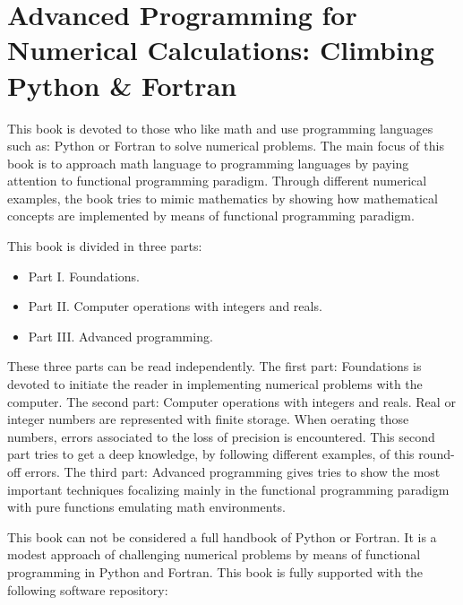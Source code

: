 \chapter*{Advanced Programming for Numerical Calculations: Climbing Python \& Fortran}
\vspace{-2.5cm}
This book is devoted to those who like math and  use  
programming languages such as: Python or Fortran to solve numerical problems.  
The main focus of this book is to approach math language to programming languages by 
paying attention to functional programming paradigm.
Through different numerical examples, 
the book tries to mimic mathematics by showing how  mathematical concepts 
are implemented by means of functional programming paradigm. 
 

This book is divided in three parts: 
\begin{itemize}
\setlength\itemsep{0cm}
\item[] Part I. Foundations. 
\item[] Part II. Computer operations with integers and reals. 
\item[] Part III. Advanced programming. 
\end{itemize}
\vspace{-0.2cm}
These three parts can be read  independently. The first part: Foundations is devoted to 
initiate the reader in implementing  numerical problems with the computer.
The second part: Computer operations with integers and reals. 
Real or integer numbers are represented with finite storage. When oerating those numbers, 
errors associated to the loss of precision is encountered. This second part tries to get a deep 
knowledge, by following different examples, of this round-off errors.   
The third part: Advanced programming gives tries to show the most important techniques 
focalizing  mainly in the functional programming paradigm with pure functions 
emulating math environments. 


This book can not be considered a full handbook of Python or Fortran. 
It is a modest approach of challenging numerical problems by means of
functional programming in Python and Fortran. 
This book is fully supported with the following software repository: 
\vspace{-0.2cm}
\begin{center} 
\end{center} 

